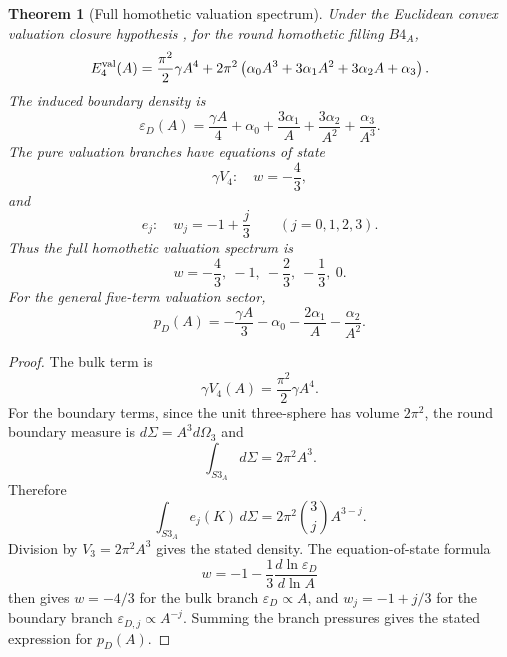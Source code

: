 \documentclass[11pt,a4paper]{article}
\def\Bfour{B4}%
\def\Sthree{S3}%
\def\dd{d}%
\numberwithin{equation}{section}
\newtheorem{theorem}[criterion]{Theorem}
\theoremstyle{remark}
\newcommand{\Sthree}{S^3}
\newcommand{\Bfour}{B^4}
\newcommand{\Efour}{E_4}
\newcommand{\epsD}{\varepsilon_D}
\newcommand{\pD}{p_D}
\newcommand{\dd}{\mathrm{d}}
\begin{document}
\begin{theorem}[Full homothetic valuation spectrum]
Under the Euclidean convex valuation closure hypothesis \cite{Hadwiger1957,Schneider2014}, for the round homothetic filling \(\Bfour_A\),
\begin{equation}
\Efour^{\rm val}(A)
=\frac{\pi^2}{2}\gamma A^4
+2\pi^2\left(
\alpha_0A^3+3\alpha_1A^2+3\alpha_2A+\alpha_3
\right).
\end{equation}
The induced boundary density is
\begin{equation}
\epsD(A)
=\frac{\gamma A}{4}
+\alpha_0+\frac{3\alpha_1}{A}
+\frac{3\alpha_2}{A^2}
+\frac{\alpha_3}{A^3}.
\end{equation}
The pure valuation branches have equations of state
\begin{equation}
\gamma V_4:\quad w=-\frac{4}{3},
\end{equation}
and
\begin{equation}
e_j:\quad w_j=-1+\frac{j}{3}\qquad (j=0,1,2,3).
\end{equation}
Thus the full homothetic valuation spectrum is
\begin{equation}
w=-\frac{4}{3},\ -1,\ -\frac{2}{3},\ -\frac{1}{3},\ 0.
\end{equation}
For the general five-term valuation sector,
\begin{equation}
\pD(A)=-\frac{\gamma A}{3}-\alpha_0-\frac{2\alpha_1}{A}-\frac{\alpha_2}{A^2}.
\end{equation}
\end{theorem}

\begin{proof}
The bulk term is
\begin{equation}
\gamma V_4(A)=\frac{\pi^2}{2}\gamma A^4.
\end{equation}
For the boundary terms, since the unit three-sphere has volume \(2\pi^2\), the round boundary measure is \(\dd\Sigma=A^3\dd\Omega_3\) and
\begin{equation}
\int_{\Sthree_A}\dd\Sigma=2\pi^2A^3.
\end{equation}
Therefore
\begin{equation}
\int_{\Sthree_A}e_j(K)\,\dd\Sigma
=2\pi^2\binom{3}{j}A^{3-j}.
\end{equation}
Division by \(V_3=2\pi^2A^3\) gives the stated density. The equation-of-state formula
\begin{equation}
w=-1-\frac{1}{3}\frac{\dd\ln\epsD}{\dd\ln A}
\end{equation}
then gives \(w=-4/3\) for the bulk branch \(\epsD\propto A\), and \(w_j=-1+j/3\) for the boundary branch \(\varepsilon_{D,j}\propto A^{-j}\). Summing the branch pressures gives the stated expression for \(\pD(A)\).
\end{proof}
\end{document}
